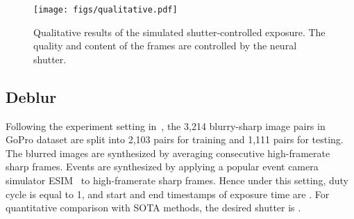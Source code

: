 \documentclass[10pt,twocolumn,letterpaper]{article}
\begin{document}
\begin{figure*}[t!]
\centering
	\texttt{[image: figs/qualitative.pdf]}
	\caption{
		Qualitative results of the simulated shutter-controlled exposure.
		The quality and content of the frames are controlled by the neural shutter.
}
	\label{fig:qualitative_results}
\end{figure*}

\subsection{Deblur}
Following the experiment setting in~\cite{EDI, EFNet}, the 3,214 blurry-sharp image pairs in GoPro dataset are split into 2,103 pairs for training and 1,111 pairs for testing. 
The blurred images are synthesized by averaging  consecutive high-framerate sharp frames.
Events are synthesized by applying a popular event camera simulator ESIM~\cite{ESIM-Simulator} to high-framerate sharp frames.
Hence under this setting, duty cycle is equal to 1, and start and end timestamps of exposure time are . For quantitative comparison with SOTA methods, the desired shutter is .
\end{document}
